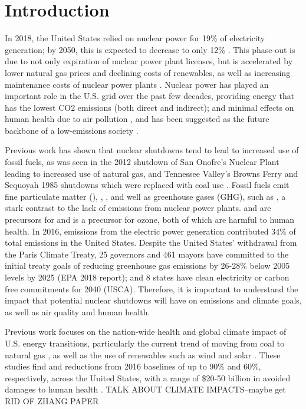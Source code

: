 \documentclass[12]{article}
\begin{document}
\bigskip
\bigskip 
\clearpage
\setcounter{page}{1}

\setlength{\leftskip}{0cm}
\setlength{\rightskip}{0cm}

\section{Introduction}
In 2018, the United States relied on nuclear power for 19\% of electricity generation; by 2050, this is expected to decrease to only 12\% \citep{eia_annual_2020}. This phase-out is due to not only expiration of nuclear power plant licenses, but is accelerated by lower natural gas prices and declining costs of renewables, as well as increasing maintenance costs of nuclear power plants \citep{davis_market_2016}. Nuclear power has played an important role in the U.S. grid over the past few decades, providing energy that has the lowest CO2 emissions (both direct and indirect); and minimal effects on human health due to air pollution \citep{markandya_electricity_2007}, and has been suggested as the future backbone of a low-emissions society \citep{iea_nuclear_2019}. 

Previous work has shown that nuclear shutdowns tend to lead to increased use of fossil fuels, as was seen in the 2012 shutdown of San Onofre’s Nuclear Plant leading to increased use of natural gas, and Tennessee Valley’s Browns Ferry and Sequoyah 1985 shutdowns which were replaced with coal use \citep{davis_market_2016,severnini_impacts_2017}. Fossil fuels emit fine particulate matter (), , , and well as greenhouse gases (GHG), such as , a stark contrast to the lack of emissions from nuclear power plants.  and  are precursors for  and  is a precursor for ozone, both of which are harmful to human health. In 2016,  emissions from the electric power generation contributed 34\% of total  emissions in the United States. Despite the United States' withdrawal from the Paris Climate Treaty, 25 governors and 461 mayors have committed to the initial treaty goals of reducing greenhouse gas emissions by 26-28\% below 2005 levels by 2025 \citep{}(EPA 2018 report); and 8 states have clean electricity or carbon free commitments for 2040 \citep{}(USCA). Therefore, it is important to understand the impact that potential nuclear shutdowns will have on  emissions and climate goals, as well as air quality and human health.

Previous work focuses on the nation-wide health and global climate impact of U.S. energy transitions, particularly the current trend of moving from coal to natural gas \citep{lueken_climate_2016, zhang_climate_2016}, as well as the use of renewables such as wind and solar \citep{millstein_climate_2017}. These studies find  and  reductions from 2016 baselines of up to 90\% and 60\%, respectively, across the United States, with a range of \$20-50 billion in avoided damages to human health \citep{lueken_climate_2016}. TALK ABOUT CLIMATE IMPACTS--maybe get RID OF ZHANG PAPER
\end{document}
